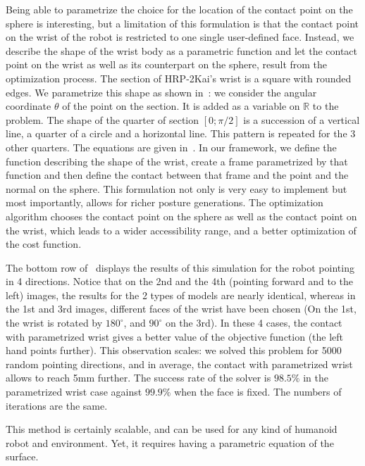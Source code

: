 Being able to parametrize the choice for the location of the contact point on the sphere is interesting, but a limitation of this formulation is that the contact point on the wrist of the robot is restricted to one single user-defined face.
Instead, we describe the shape of the wrist body as a parametric function and let the contact point on the wrist as well as its counterpart on the sphere, result from the optimization process.
The section of HRP-2Kai's wrist is a square with rounded edges.
We parametrize this shape as shown in~:
we consider the angular coordinate $\theta$ of the point on the section.
It is added as a variable on $\mathbb{R}$ to the problem.
The shape of the quarter of section $[0;\pi/2]$ is a succession of a vertical line, a quarter of a circle and a horizontal line.
This pattern is repeated for the 3 other quarters.
The equations are given in~.
In our framework, we define the function describing the shape of the wrist, create a frame parametrized by that function and then define the contact between that frame and the point and the normal on the sphere.
This formulation not only is very easy to implement but most importantly, allows for richer posture generations.
The optimization algorithm chooses the contact point on the sphere as well as the contact point on the wrist, which leads to a wider accessibility range, and a better optimization of the cost function.

The bottom row of~ displays the results of this simulation for the robot pointing in 4 directions.
Notice that on the 2nd and the 4th (pointing forward and to the left) images, the results for the 2 types of models are nearly identical, whereas in the 1st and 3rd images, different faces of the wrist have been chosen (On the 1st, the wrist is rotated by $180^{\circ}$, and $90^{\circ}$ on the 3rd).
In these 4 cases, the contact with parametrized wrist gives a better value of the objective function (the left hand points further).
This observation scales:
we solved this problem for 5000 random pointing directions, and in average, the contact with parametrized wrist allows to reach 5mm further.
The success rate of the solver is $98.5\%$ in the parametrized wrist case against $99.9\%$ when the face is fixed.
The numbers of iterations are the same.

This method is certainly scalable, and can be used for any kind of humanoid robot and environment.
Yet, it requires having a parametric equation of the surface.

